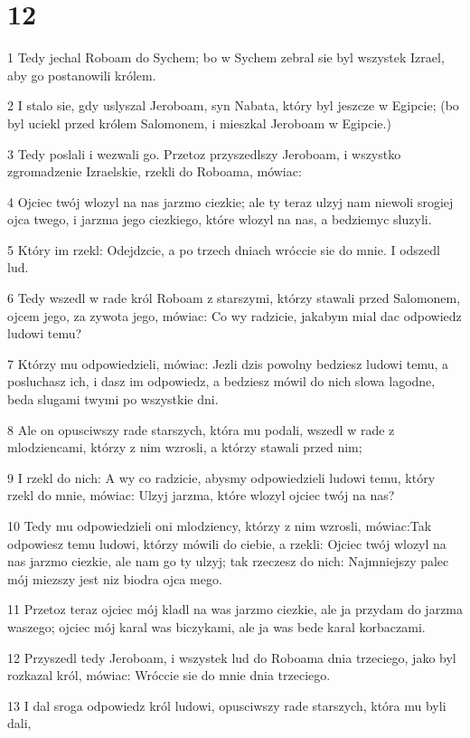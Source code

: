 \chapter{12}

\par 1 Tedy jechal Roboam do Sychem; bo w Sychem zebral sie byl wszystek Izrael, aby go postanowili królem.
\par 2 I stalo sie, gdy uslyszal Jeroboam, syn Nabata, który byl jeszcze w Egipcie; (bo byl uciekl przed królem Salomonem, i mieszkal Jeroboam w Egipcie.)
\par 3 Tedy poslali i wezwali go. Przetoz przyszedlszy Jeroboam, i wszystko zgromadzenie Izraelskie, rzekli do Roboama, mówiac:
\par 4 Ojciec twój wlozyl na nas jarzmo ciezkie; ale ty teraz ulzyj nam niewoli srogiej ojca twego, i jarzma jego ciezkiego, które wlozyl na nas, a bedziemyc sluzyli.
\par 5 Który im rzekl: Odejdzcie, a po trzech dniach wróccie sie do mnie. I odszedl lud.
\par 6 Tedy wszedl w rade król Roboam z starszymi, którzy stawali przed Salomonem, ojcem jego, za zywota jego, mówiac: Co wy radzicie, jakabym mial dac odpowiedz ludowi temu?
\par 7 Którzy mu odpowiedzieli, mówiac: Jezli dzis powolny bedziesz ludowi temu, a posluchasz ich, i dasz im odpowiedz, a bedziesz mówil do nich slowa lagodne, beda slugami twymi po wszystkie dni.
\par 8 Ale on opusciwszy rade starszych, która mu podali, wszedl w rade z mlodziencami, którzy z nim wzrosli, a którzy stawali przed nim;
\par 9 I rzekl do nich: A wy co radzicie, abysmy odpowiedzieli ludowi temu, który rzekl do mnie, mówiac: Ulzyj jarzma, które wlozyl ojciec twój na nas?
\par 10 Tedy mu odpowiedzieli oni mlodziency, którzy z nim wzrosli, mówiac:Tak odpowiesz temu ludowi, którzy mówili do ciebie, a rzekli: Ojciec twój wlozyl na nas jarzmo ciezkie, ale nam go ty ulzyj; tak rzeczesz do nich: Najmniejszy palec mój miezszy jest niz biodra ojca mego.
\par 11 Przetoz teraz ojciec mój kladl na was jarzmo ciezkie, ale ja przydam do jarzma waszego; ojciec mój karal was biczykami, ale ja was bede karal korbaczami.
\par 12 Przyszedl tedy Jeroboam, i wszystek lud do Roboama dnia trzeciego, jako byl rozkazal król, mówiac: Wróccie sie do mnie dnia trzeciego.
\par 13 I dal sroga odpowiedz król ludowi, opusciwszy rade starszych, która mu byli dali,
